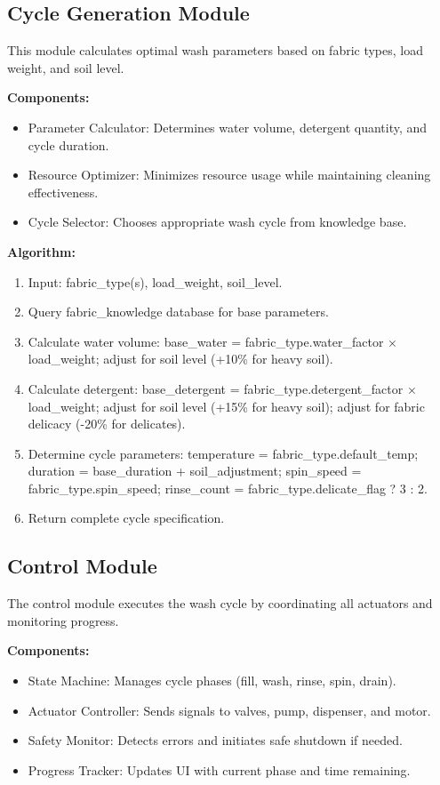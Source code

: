 \subsection{Cycle Generation Module}

This module calculates optimal wash parameters based on fabric types, load weight, and soil level.

\textbf{Components:}
\begin{itemize}
    \item Parameter Calculator: Determines water volume, detergent quantity, and cycle duration.
    \item Resource Optimizer: Minimizes resource usage while maintaining cleaning effectiveness.
    \item Cycle Selector: Chooses appropriate wash cycle from knowledge base.
\end{itemize}

\textbf{Algorithm:}
\begin{enumerate}
    \item Input: fabric\_type(s), load\_weight, soil\_level.
    \item Query fabric\_knowledge database for base parameters.
    \item Calculate water volume: base\_water = fabric\_type.water\_factor × load\_weight; adjust for soil level (+10\% for heavy soil).
    \item Calculate detergent: base\_detergent = fabric\_type.detergent\_factor × load\_weight; adjust for soil level (+15\% for heavy soil); adjust for fabric delicacy (-20\% for delicates).
    \item Determine cycle parameters: temperature = fabric\_type.default\_temp; duration = base\_duration + soil\_adjustment; spin\_speed = fabric\_type.spin\_speed; rinse\_count = fabric\_type.delicate\_flag ? 3 : 2.
    \item Return complete cycle specification.
\end{enumerate}

\subsection{Control Module}

The control module executes the wash cycle by coordinating all actuators and monitoring progress.

\textbf{Components:}
\begin{itemize}
    \item State Machine: Manages cycle phases (fill, wash, rinse, spin, drain).
    \item Actuator Controller: Sends signals to valves, pump, dispenser, and motor.
    \item Safety Monitor: Detects errors and initiates safe shutdown if needed.
    \item Progress Tracker: Updates UI with current phase and time remaining.
\end{itemize}

